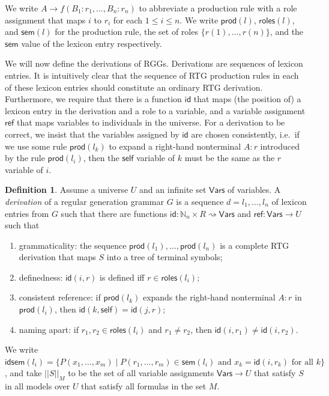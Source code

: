 \documentclass[11pt,a4]{article}
\def\N{\mathbb{N}}
\newcommand{\sem}{\mathsf{sem}}
\newcommand{\self}{\mathsf{self}}
\newcommand{\produ}{\mathsf{prod}}
\newcommand{\roles}{\mathsf{roles}}
\newcommand{\Neq}{{:}}
\newcommand{\refr}{\mathsf{ref}}
\newcommand{\id}{\mathsf{id}}
\newcommand{\idsem}{\mathsf{idsem}}
\newcommand{\Vars}{\mathsf{Vars}}
\theoremstyle{plain}
\theoremstyle{definition}
\newtheorem{definition}[theorem]{Definition}
\begin{document}
We write $A \rightarrow f(B_1\Neq r_1,\ldots,B_n \Neq r_n)$ to
abbreviate a production rule with a role assignment that maps $i$ to
$r_i$ for each $1 \leq i \leq n$. We write $\produ(l)$, $\roles(l)$,
and $\sem(l)$ for the production rule, the set of roles
$\{r(1),\ldots,r(n)\}$, and the $\sem$ value of the lexicon entry
respectively.

We will now define the derivations of RGGs. Derivations are sequences
of lexicon entries. It is intuitively clear that the sequence of RTG
production rules in each of these lexicon entries should constitute an
ordinary RTG derivation. Furthermore, we require that there is a
function $\id$ that maps (the position of) a lexicon entry in the
derivation and a role to a variable, and a variable assignment $\refr$
that maps variables to individuals in the universe. For a derivation
to be correct, we insist that the variables assigned by $\id$ are
chosen consistently, i.e.\ if we use some rule $\produ(l_k)$ to expand
a right-hand nonterminal $A \Neq r$ introduced by the rule
$\produ(l_i)$, then the $\self$ variable of $k$ must be the same as
the $r$ variable of $i$.

\begin{definition} \label{def:rgg-deriv}
  Assume a universe $U$ and an infinite set $\Vars$ of variables. A
  \emph{derivation} of a regular generation grammar $G$ is a sequence
  $d = l_1,\ldots,l_n$ of lexicon entries from $G$ such that there are
  functions $\id:\N_n \times R \rightsquigarrow \Vars$ and
  $\refr:\Vars \rightarrow U$ such that
  \begin{enumerate}
  \item grammaticality: the sequence $\produ(l_1),\ldots,\produ(l_n)$
    is a complete RTG derivation that maps $S$ into a tree of terminal
    symbols;
  \item definedness: $\id(i,r)$ is defined iff $r \in
    \roles(l_i)$;
  \item consistent reference: if $\produ(l_k)$ expands the right-hand
    nonterminal $A:r$ in $\produ(l_i)$, then $\id(k,\self) =
    \id(j,r)$;
  \item naming apart: if $r_1,r_2 \in \roles(l_i)$ and $r_1\neq r_2$,
    then $\id(i,r_1) \neq \id(i,r_2)$.
  \end{enumerate}
\end{definition}

We write $\idsem(l_i) = \{P(x_1,\ldots,x_m) \;|\;
\mbox{$P(r_1,\ldots,r_m) \in \sem(l_i)$ and $x_k = \id(i,r_k)$ for all
  $k$}\}$, and take $||S||_M$ to be the set of all variable
assignments $\Vars \rightarrow U$ that satisfy $S$ in all models over
$U$ that satisfy all formulas in the set $M$.
\end{document}
